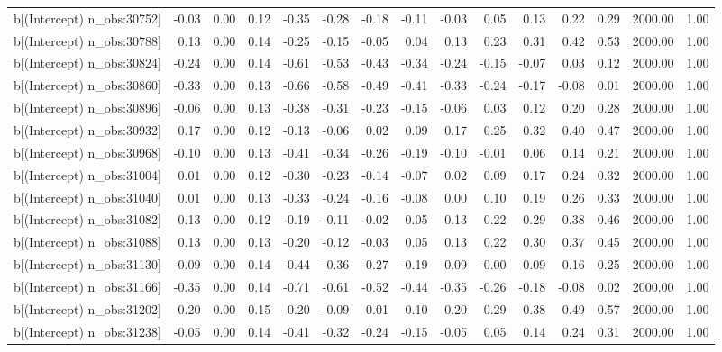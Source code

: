 \begin{table}[ht]
\begin{tabular}{rrrrrrrrrrrrrrr}
  b[(Intercept) n\_obs:30752] & -0.03 & 0.00 & 0.12 & -0.35 & -0.28 & -0.18 & -0.11 & -0.03 & 0.05 & 0.13 & 0.22 & 0.29 & 2000.00 & 1.00 \\ 
  b[(Intercept) n\_obs:30788] & 0.13 & 0.00 & 0.14 & -0.25 & -0.15 & -0.05 & 0.04 & 0.13 & 0.23 & 0.31 & 0.42 & 0.53 & 2000.00 & 1.00 \\ 
  b[(Intercept) n\_obs:30824] & -0.24 & 0.00 & 0.14 & -0.61 & -0.53 & -0.43 & -0.34 & -0.24 & -0.15 & -0.07 & 0.03 & 0.12 & 2000.00 & 1.00 \\ 
  b[(Intercept) n\_obs:30860] & -0.33 & 0.00 & 0.13 & -0.66 & -0.58 & -0.49 & -0.41 & -0.33 & -0.24 & -0.17 & -0.08 & 0.01 & 2000.00 & 1.00 \\ 
  b[(Intercept) n\_obs:30896] & -0.06 & 0.00 & 0.13 & -0.38 & -0.31 & -0.23 & -0.15 & -0.06 & 0.03 & 0.12 & 0.20 & 0.28 & 2000.00 & 1.00 \\ 
  b[(Intercept) n\_obs:30932] & 0.17 & 0.00 & 0.12 & -0.13 & -0.06 & 0.02 & 0.09 & 0.17 & 0.25 & 0.32 & 0.40 & 0.47 & 2000.00 & 1.00 \\ 
  b[(Intercept) n\_obs:30968] & -0.10 & 0.00 & 0.13 & -0.41 & -0.34 & -0.26 & -0.19 & -0.10 & -0.01 & 0.06 & 0.14 & 0.21 & 2000.00 & 1.00 \\ 
  b[(Intercept) n\_obs:31004] & 0.01 & 0.00 & 0.12 & -0.30 & -0.23 & -0.14 & -0.07 & 0.02 & 0.09 & 0.17 & 0.24 & 0.32 & 2000.00 & 1.00 \\ 
  b[(Intercept) n\_obs:31040] & 0.01 & 0.00 & 0.13 & -0.33 & -0.24 & -0.16 & -0.08 & 0.00 & 0.10 & 0.19 & 0.26 & 0.33 & 2000.00 & 1.00 \\ 
  b[(Intercept) n\_obs:31082] & 0.13 & 0.00 & 0.12 & -0.19 & -0.11 & -0.02 & 0.05 & 0.13 & 0.22 & 0.29 & 0.38 & 0.46 & 2000.00 & 1.00 \\ 
  b[(Intercept) n\_obs:31088] & 0.13 & 0.00 & 0.13 & -0.20 & -0.12 & -0.03 & 0.05 & 0.13 & 0.22 & 0.30 & 0.37 & 0.45 & 2000.00 & 1.00 \\ 
  b[(Intercept) n\_obs:31130] & -0.09 & 0.00 & 0.14 & -0.44 & -0.36 & -0.27 & -0.19 & -0.09 & -0.00 & 0.09 & 0.16 & 0.25 & 2000.00 & 1.00 \\ 
  b[(Intercept) n\_obs:31166] & -0.35 & 0.00 & 0.14 & -0.71 & -0.61 & -0.52 & -0.44 & -0.35 & -0.26 & -0.18 & -0.08 & 0.02 & 2000.00 & 1.00 \\ 
  b[(Intercept) n\_obs:31202] & 0.20 & 0.00 & 0.15 & -0.20 & -0.09 & 0.01 & 0.10 & 0.20 & 0.29 & 0.38 & 0.49 & 0.57 & 2000.00 & 1.00 \\ 
  b[(Intercept) n\_obs:31238] & -0.05 & 0.00 & 0.14 & -0.41 & -0.32 & -0.24 & -0.15 & -0.05 & 0.05 & 0.14 & 0.24 & 0.31 & 2000.00 & 1.00 \\ 

\end{tabular}
\end{table}
